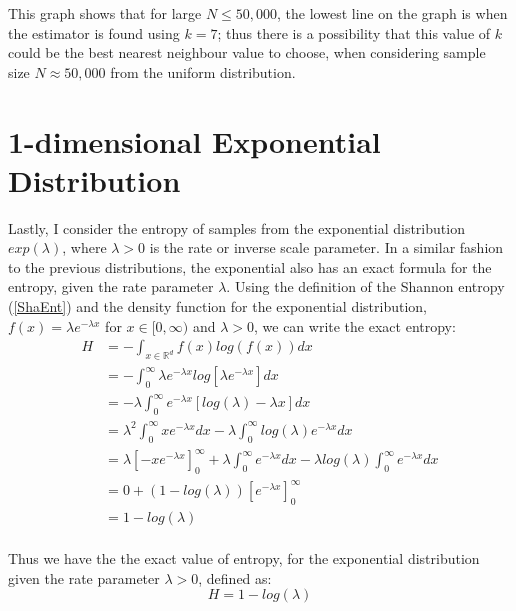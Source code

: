\documentclass[12pt]{report}
\begin{document}
This graph shows that for large $N \leq 50,000$, the lowest line on the graph is when the estimator is found using $k=7$; thus there is a possibility that this value of $k$ could be the best nearest neighbour value to choose, when considering sample size $N \approx 50,000$ from the uniform distribution.









\section{1-dimensional Exponential Distribution} \label{Expo_d=1}

Lastly, I consider the entropy of samples from the exponential distribution $exp(\lambda)$, where $\lambda > 0$ is the rate or inverse scale parameter. In a similar fashion to the previous distributions, the exponential also has an exact formula for the entropy, given the rate parameter $\lambda$. Using the definition of the Shannon entropy (\ref{ShaEnt}) and the density function for the exponential distribution, $f(x) = \lambda e^{-\lambda x}$ for $x \in [0, \infty)$ and $\lambda >0$, we can write the exact entropy:
\begin{align*}
H &= - \int_{x \in \mathbb{R}^d} f(x) log(f(x)) dx \\ 
&= - \int_{0}^{\infty} \lambda e^{-\lambda x} log [ \lambda e^{-\lambda x} ] dx  \\
&= - \lambda \int_{0}^{\infty} e^{-\lambda x} [log(\lambda) - \lambda x] dx  \\
&= \lambda^2 \int_{0}^{\infty} x e^{-\lambda x} dx - \lambda \int_{0}^{\infty} log(\lambda) e^{-\lambda x} dx \\
&= \lambda \left[ -x e^{-\lambda x} \right]_{0}^{\infty} + \lambda \int_{0}^{\infty} e^{-\lambda x} dx - \lambda log(\lambda)  \int_{0}^{\infty} e^{-\lambda x} dx \\
&= 0 + (1 - log(\lambda)) \left[e^{-\lambda x} \right]_{0}^{\infty} \\
&= 1 - log(\lambda) \\
\end{align*}

Thus we have the the exact value of entropy, for the exponential distribution given the rate parameter $\lambda > 0$, defined as:
\begin{equation} \label{ExpEnt}
H = 1 - log(\lambda)
\end{equation}
\end{document}

